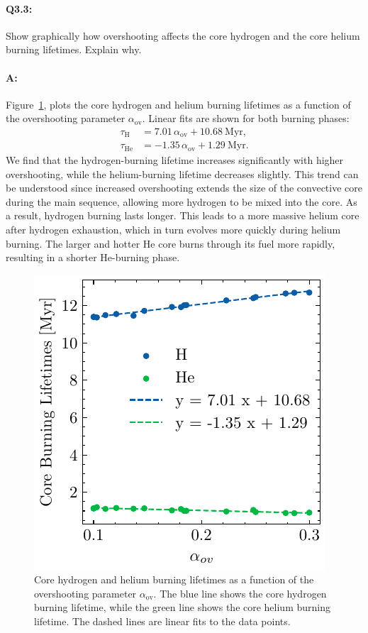 \documentclass[twocolumn,fontsize=11pt]{scrartcl}
\begin{document}
\paragraph{Q3.3:} Show graphically how overshooting affects the core hydrogen and the core helium burning lifetimes. Explain why.

\paragraph{A:} Figure~\ref{fig:q31core_burning_lifetime}, plots the core hydrogen and helium burning lifetimes as a function of the overshooting parameter \(\alpha_{\mathrm{ov}}\). Linear fits are shown for both burning phases:
\begin{align*}
    \tau_{\mathrm{H}} &= 7.01\,\alpha_{\mathrm{ov}} + 10.68\ \text{Myr}, \\
    \tau_{\mathrm{He}} &= -1.35\,\alpha_{\mathrm{ov}} + 1.29\ \text{Myr}.
\end{align*}
We find that the hydrogen-burning lifetime increases significantly with higher overshooting, while the helium-burning lifetime decreases slightly. This trend can be understood since increased overshooting extends the size of the convective core during the main sequence, allowing more hydrogen to be mixed into the core. As a result, hydrogen burning lasts longer. This leads to a more massive helium core after hydrogen exhaustion, which in turn evolves more quickly during helium burning. The larger and hotter He core burns through its fuel more rapidly, resulting in a shorter He-burning phase.
\begin{figure}[htbp]
    \centering
    \includegraphics{q31core_burning_lifetime.pdf}
    \caption{Core hydrogen and helium burning lifetimes as a function of the overshooting parameter \(\alpha_{\mathrm{ov}}\). The blue line shows the core hydrogen burning lifetime, while the green line shows the core helium burning lifetime. The dashed lines are linear fits to the data points.}
    \label{fig:q31core_burning_lifetime}
\end{figure}
\end{document}
